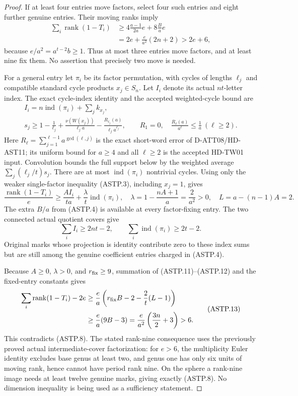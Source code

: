 \begin{proof}
If at least four entries move factors, select four such entries
and eight further genuine entries.  Their moving ranks imply
\[
 \begin{split}
 \sum_i\operatorname{rank}(1-T_i)
 &\ge4\frac{a-1}{2a}e+8\frac Ba e\\
 &=2e+\frac{e}{a^2}(2n+2)>2e+6,
 \end{split}
 \tag{ASTP.9}
\]
because $e/a^2=a^{t-2}b\ge1$.  Thus at most three entries move
factors, and at least nine fix them.  No assertion that precisely
two move is needed.

For a general entry let $\pi_i$ be its factor permutation, with
cycles of lengths $\ell_j$ and compatible standard cycle products
$x_j\in S_n$.  Let $I_i$ denote its actual $nt$-letter index.
The exact cycle-index identity and the accepted weighted-cycle
bound are
\[
 \begin{gathered}
 I_i=n\operatorname{ind}(\pi_i)+\sum_j k_{x_j},\\
 s_j\ge1-\frac1{\ell_j}
      +\frac{\nu(W(x_j))}{\ell_j a}
      -\frac{R_{\ell_j}(a)}{\ell_j a^{\ell_j}},\qquad
 R_1=0,\quad \frac{R_\ell(a)}{a^\ell}\le\frac1a\ (\ell\ge2).
 \end{gathered}
 \tag{ASTP.10}
\]
Here $R_\ell=\sum_{j=1}^{\ell-1}a^{\gcd(\ell,j)}$ is the exact
short-word error of D-ATT08/HD-AST11; its uniform bound for
$a\ge4$ and all $\ell\ge2$ is the accepted HD-TW01 input.
Convolution bounds the full support below by the weighted average
$\sum_j(\ell_j/t)s_j$.  There are at most
$\operatorname{ind}(\pi_i)$ nontrivial cycles.  Using only the
weaker single-factor inequality (ASTP.3), including $x_j=1$, gives
\[
 \frac{\operatorname{rank}(1-T_i)}e
 \ge\frac{A I_i}{ta}
       +\frac{\lambda}{t}\operatorname{ind}(\pi_i),
 \quad
 \lambda=1-\frac{nA+1}{a}=\frac2{a^2}>0,
 \quad L=a-(n-1)A=2.
 \tag{ASTP.11}
\]
The extra $B/a$ from (ASTP.4) is available at every factor-fixing
entry.  The two connected actual quotient covers give
\[
          \sum_i I_i\ge2nt-2,
          \qquad\sum_i\operatorname{ind}(\pi_i)\ge2t-2.
 \tag{ASTP.12}
\]
Original marks whose projection is identity contribute zero to
these index sums but are still among the genuine coefficient
entries charged in (ASTP.4).

Because $A\ge0$, $\lambda>0$, and $r_{\rm fix}\ge9$, summation
of (ASTP.11)--(ASTP.12) and the fixed-entry constants gives
\[
 \begin{split}
 \sum_i\operatorname{rank}(1-T_i)-2e
 &\ge\frac ea\left(r_{\rm fix}B-2-\frac2t(L-1)\right)\\
 &\ge\frac ea(9B-3)
   =\frac{e}{a^2}\left(\frac{3n}{2}+3\right)>6.
 \end{split}
 \tag{ASTP.13}
\]
This contradicts (ASTP.8).  The stated rank-nine consequence uses
the previously proved actual intermediate-cover factorization:
for $e>6$, the multiplicity Euler identity excludes base genus
at least two, and genus one has only six units of moving rank,
hence cannot have period rank nine.  On the sphere a rank-nine
image needs at least twelve genuine marks, giving exactly (ASTP.8).
No dimension inequality is being used as a sufficiency statement.
\end{proof}

